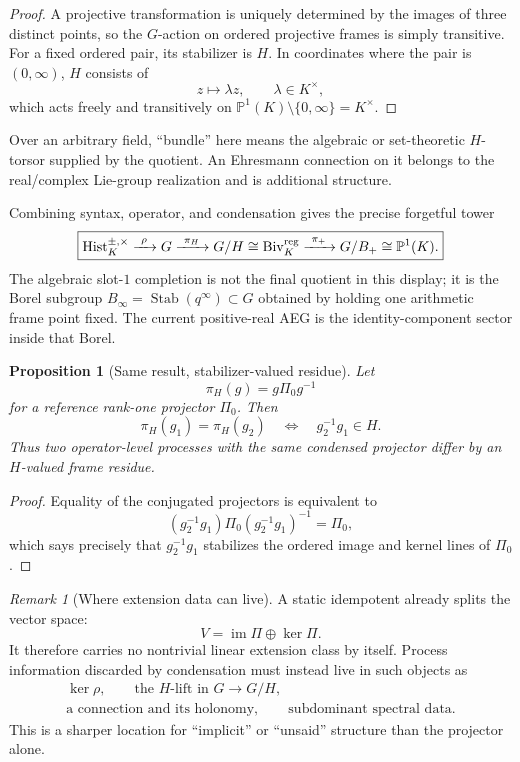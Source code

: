 \documentclass[11pt]{article}
\newtheorem{proposition}[theorem]{Proposition}
\theoremstyle{definition}
\theoremstyle{remark}
\newtheorem{remark}[theorem]{Remark}
\newcommand{\Biv}{\operatorname{Biv}}
\newcommand{\Hist}{\operatorname{Hist}}
\newcommand{\Stab}{\operatorname{Stab}}
\newcommand{\im}{\operatorname{im}}
\newcommand{\PP}{\mathbb P}
\begin{document}
\begin{proof}
A projective transformation is uniquely determined by the images of three
distinct points, so the \(G\)-action on ordered projective frames is simply
transitive.  For a fixed ordered pair, its stabilizer is \(H\).  In coordinates
where the pair is \((0,\infty)\), \(H\) consists of
\[
z\longmapsto\lambda z,\qquad\lambda\in K^\times,
\]
which acts freely and transitively on
\(\PP^1(K)\setminus\{0,\infty\}=K^\times\).
\end{proof}

Over an arbitrary field, ``bundle'' here means the algebraic or set-theoretic
\(H\)-torsor supplied by the quotient.  An Ehresmann connection on it belongs
to the real/complex Lie-group realization and is additional structure.

Combining syntax, operator, and condensation gives the precise forgetful
tower
\begin{equation}
\boxed{
\Hist_K^{\pm,\times}
\xrightarrow{\ \rho\ }
G
\xrightarrow{\ \pi_H\ }
G/H\cong\Biv_K^{\rm reg}
\xrightarrow{\ \pi_+\ }
G/B_+\cong\PP^1(K).
}
\label{eq:main-forgetful-tower}
\end{equation}
The algebraic slot-\(1\) completion is not the final quotient in this display;
it is the Borel subgroup \(B_\infty=\Stab(q^\infty)\subset G\) obtained by
holding one arithmetic frame point fixed.  The current positive-real AEG is
the identity-component sector inside that Borel.

\begin{proposition}[Same result, stabilizer-valued residue]
Let
\[
\pi_H(g)=g\Pi_0g^{-1}
\]
for a reference rank-one projector \(\Pi_0\).  Then
\[
\pi_H(g_1)=\pi_H(g_2)
\quad\Longleftrightarrow\quad
g_2^{-1}g_1\in H.
\]
Thus two operator-level processes with the same condensed projector differ by
an \(H\)-valued frame residue.
\end{proposition}

\begin{proof}
Equality of the conjugated projectors is equivalent to
\[
(g_2^{-1}g_1)\Pi_0(g_2^{-1}g_1)^{-1}=\Pi_0,
\]
which says precisely that \(g_2^{-1}g_1\) stabilizes the ordered image and
kernel lines of \(\Pi_0\).
\end{proof}

\begin{remark}[Where extension data can live]
A static idempotent already splits the vector space:
\[
V=\im\Pi\oplus\ker\Pi.
\]
It therefore carries no nontrivial linear extension class by itself.  Process
information discarded by condensation must instead live in such objects as
\[
\begin{gathered}
\ker\rho,\qquad \text{the \(H\)-lift in }G\to G/H,\\
\text{a connection and its holonomy},\qquad
\text{subdominant spectral data}.
\end{gathered}
\]
This is a sharper location for ``implicit'' or ``unsaid'' structure than the
projector alone.
\end{remark}
\end{document}
